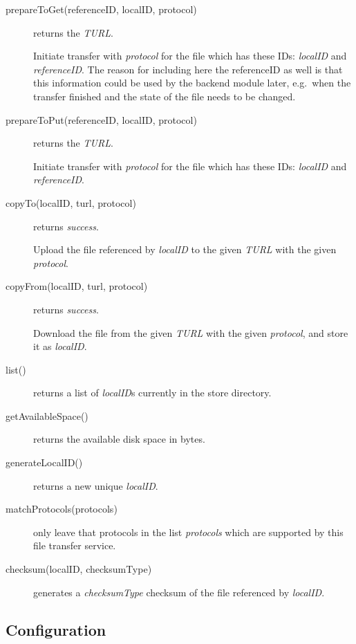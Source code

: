 \documentclass{book}
\begin{document}
\begin{description}
    \item[prepareToGet(referenceID, localID, protocol)] returns the \emph{TURL}.
    
    Initiate transfer with \emph{protocol} for the file which has these IDs: \emph{localID} and \emph{referenceID}. The reason for including here the referenceID as well is that this information could be used by the backend module later, e.g.~when the transfer finished and the state of the file needs to be changed.
    
    \item[prepareToPut(referenceID, localID, protocol)] returns the \emph{TURL}.
    
    Initiate transfer with \emph{protocol} for the file which has these IDs: \emph{localID} and \emph{referenceID}.
    
    \item[copyTo(localID, turl, protocol)] returns \emph{success}.
    
    Upload the file referenced by \emph{localID} to the given \emph{TURL} with the given \emph{protocol}.
    
    \item[copyFrom(localID, turl, protocol)] returns \emph{success}.
    
    Download the file from the given \emph{TURL} with the given \emph{protocol}, and store it as \emph{localID}.
    
    \item[list()] returns a list of \emph{localID}s currently in the store directory.
    \item[getAvailableSpace()] returns the available disk space in bytes.
    \item[generateLocalID()] returns a new unique \emph{localID}.
    \item[matchProtocols(protocols)] only leave that protocols in the list \emph{protocols} which are supported by this file transfer service.
    \item[checksum(localID, checksumType)] generates a \emph{checksumType} checksum of the file referenced by \emph{localID}.
\end{description}


\subsection{Configuration} %
\end{document}
